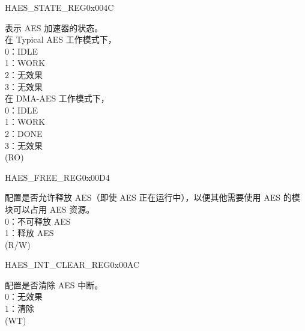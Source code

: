 \begin{register}{H}{AES\_STATE\_REG}{0x004C}\label{regdesc:AESSTATEREG}
%
%
\regnewline%
\begin{regdesc}\begin{reglist}
\item [AES\_STATE] 表示 AES 加速器的状态。\\
在 Typical AES 工作模式下，\\
0：IDLE \\
1：WORK\\
2：无效果\\
3：无效果\\
在 DMA-AES 工作模式下，\\
0：IDLE\\
1：WORK\\
2：DONE\\
3：无效果\\
(RO)
\end{reglist}\end{regdesc}
\end{register}


\begin{register}{H}{AES\_FREE\_REG}{0x00D4}\label{regdesc:AESFREEREG}
%
%
\regnewline%
\begin{regdesc}\begin{reglist}
\label{fielddesc:AESFREE}\item [AES\_FREE] 配置是否允许释放 AES（即使 AES 正在运行中），以便其他需要使用 AES 的模块可以占用 AES 资源。\\
0：不可释放 AES\\
1：释放 AES\\
(R/W)
\end{reglist}\end{regdesc}
\end{register}


\begin{register}{H}{AES\_INT\_CLEAR\_REG}{0x00AC}\label{regdesc:AESINTCLEARREG}
%
%
\regnewline%
\begin{regdesc}\begin{reglist}
\item [AES\_INT\_CLEAR] 配置是否清除 AES 中断。\\
0：无效果\\
1：清除\\
(WT)
\end{reglist}\end{regdesc}
\end{register}


